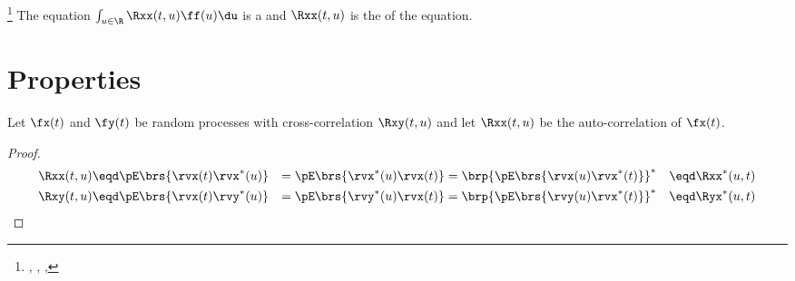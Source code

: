 \begin{remark}
\footnote{
     ,
     ,
     ,
   }
The equation $\int_{u\in\R}\Rxx(t,u)\ff(u) \du$ is a
    and
   $\Rxx(t,u)$ is the  of the equation.
\end{remark}

\section{Properties}

\begin{theorem}
\label{thm:Rxx_prop}
Let $\fx(t)$ and $\fy(t)$ be random processes with
cross-correlation $\Rxy(t,u)$ and
let $\Rxx(t,u)$ be the auto-correlation of $\fx(t)$.
\end{theorem}
\begin{proof}
\begin{align*}
   \Rxx(t,u)
      &\eqd \pE\brs{\rvx(t) \rvx^\ast(u)}
      &=    \pE\brs{\rvx^\ast(u) \rvx(t)}
      &=    \brp{ \pE\brs{\rvx(u) \rvx^\ast(t)}}^\ast
      &\eqd \Rxx^\ast(u,t)
\\
   \Rxy(t,u)
      &\eqd \pE\brs{\rvx(t) \rvy^\ast(u)}
      &=    \pE\brs{\rvy^\ast(u) \rvx(t) }
      &=    \brp{\pE\brs{\rvy(u) \rvx^\ast(t)}}^\ast
      &\eqd \Ryx^\ast(u,t)
\end{align*}
\end{proof}



